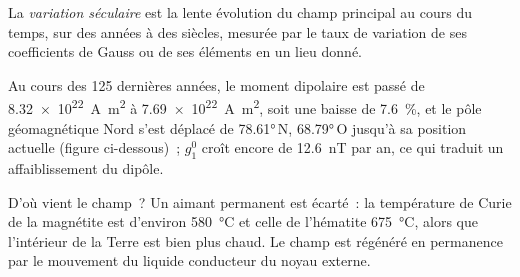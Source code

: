 \begin{definition}\label{def:b3:palaeomagnetism:secular}
La \emph{variation séculaire} est la lente évolution du
champ principal au cours du temps, sur des années à des siècles, mesurée par le taux de
variation de ses coefficients de Gauss ou de ses éléments en un lieu donné.
\end{definition}

Au cours des 125 dernières années, le moment dipolaire est passé de
\qty{8.32e22}{A.m^2} à \qty{7.69e22}{A.m^2}, soit une baisse de \qty{7.6}{\percent}, et le
pôle géomagnétique Nord s'est déplacé de \ang{78.61}\,N, \ang{68.79}\,O jusqu'à
sa position actuelle (figure ci-dessous)~; $g_1^0$ croît encore de \qty{12.6}{nT} par an,
ce qui traduit un affaiblissement du dipôle.

\begin{omfigure}

\par{}\label{fig:b3:palaeomagnetism:dipole}
\end{omfigure}

D'où vient le champ~? Un aimant permanent est écarté~: la température de Curie
de la magnétite est d'environ \qty{580}{\celsius} et celle de l'hématite
\qty{675}{\celsius}, alors que l'intérieur de la Terre est bien plus chaud. Le champ est
régénéré en permanence par le mouvement du liquide conducteur du noyau
externe.


